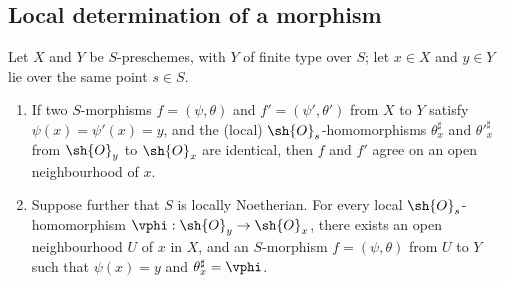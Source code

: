 \subsection{Local determination of a morphism}
\label{subsection:I.6.5}

\begin{proposition}[6.5.1]
\label{I.6.5.1}
Let $X$ and $Y$ be $S$-preschemes, with $Y$ of finite type over $S$;
let $x\in X$ and $y\in Y$ lie over the same point $s\in S$.
\begin{enumerate}
  \item[{\rm(i)}] If two $S$-morphisms $f=(\psi,\theta)$ and $f'=(\psi',\theta')$ from $X$ to $Y$ satisfy $\psi(x)=\psi'(x)=y$, and the (local) $\sh{O}_s$-homomorphisms $\theta_x^\sharp$ and ${\theta'}_x^\sharp$ from $\sh{O}_y$ to $\sh{O}_x$ are identical, then $f$ and $f'$ agree on an open neighbourhood of $x$.
  \item[{\rm(ii)}] Suppose further that $S$ is locally Noetherian.
    For every local $\sh{O}_s$-homomorphism $\vphi:\sh{O}_y\to\sh{O}_x$, there exists an open neighbourhood $U$ of $x$ in $X$, and an $S$-morphism $f=(\psi,\theta)$ from $U$ to $Y$ such that $\psi(x)=y$ and $\theta_x^\sharp=\vphi$.
\end{enumerate}
\end{proposition}

